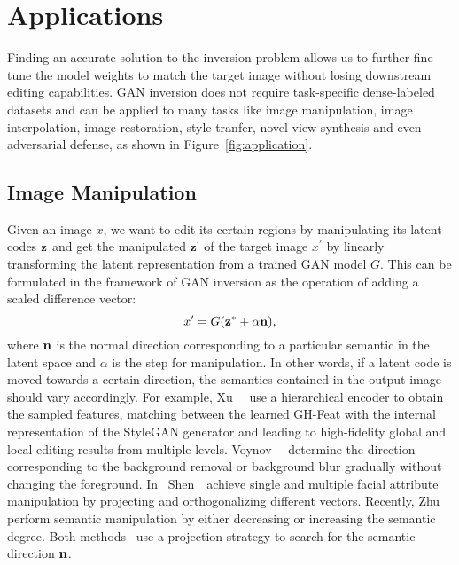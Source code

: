 \section{Applications}
\label{sec:applications}

Finding an accurate solution to the inversion problem allows us to further fine-tune the model weights to match the target image without losing downstream editing capabilities.
GAN inversion does not require task-specific dense-labeled datasets and can be applied to many tasks like image manipulation, image interpolation, image restoration, style tranfer, novel-view synthesis and even adversarial defense, as shown in Figure~\ref{fig:application}.

\subsection{Image Manipulation}
\label{sec:manipulation}

Given an image $x$, we want to edit its certain regions by manipulating its latent codes $\mathbf{z}$ and get the manipulated ${\mathbf{z^{\prime}}}$ of the target image ${x^{\prime}}$ by linearly transforming the latent representation from a trained GAN model $G$. 
This can be formulated in the framework of GAN inversion as the operation of adding a scaled difference vector:
\begin{equation}
x^{\prime}=G(\mathbf{z}^{*}+\alpha \mathbf{n}), 
\end{equation}
where $\mathbf{n}$ is the normal direction corresponding to a particular semantic in the latent space and $\alpha$ is the step for manipulation. 
In other words, if a latent code is moved towards a certain direction, the semantics contained in the output image should vary accordingly. 
For example, Xu~\etal~\cite{xu2020ghfeat} use a hierarchical encoder to obtain the sampled features, matching between the learned GH-Feat with the internal representation of the StyleGAN generator and leading to high-fidelity global and local editing results from multiple levels.
Voynov~\etal~\cite{voynov2020latent} determine the direction corresponding to the background removal or background blur gradually without changing the foreground.
In~\cite{shen2020interpreting} Shen~\etal~achieve single and multiple facial attribute manipulation by projecting and orthogonalizing different vectors.
Recently, Zhu~\etal~\cite{zhu2020indomain} perform semantic manipulation by either decreasing or increasing the semantic degree. 
Both methods~\cite{shen2020interpreting,zhu2020indomain} use a projection strategy to search for the semantic direction $\mathbf{n}$.

